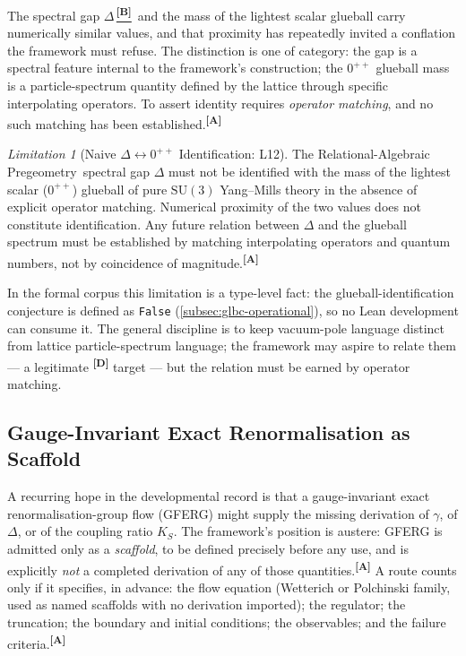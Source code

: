 \documentclass[12pt,a4paper,twoside]{article}
\theoremstyle{plain}
\theoremstyle{definition}
\theoremstyle{remark}
\newtheorem{limitation}[theorem]{Limitation}
\newcommand{\ProjectShort}{Relational-Algebraic Pregeometry}
\newcommand{\RAP}{\ProjectShort}
\newcommand{\catmark}[1]{\textsuperscript{\textsf{\textbf{[#1]}}}}
\newcommand{\Bdelta}{\hyperref[box:pi-override-delta]{\catmark{B}}}
\begin{document}
The spectral gap $\Delta$\,\Bdelta\ and the mass of the lightest scalar
glueball carry numerically similar values, and that proximity has
repeatedly invited a conflation the framework must refuse. The
distinction is one of category: the gap is a spectral feature internal
to the framework's construction; the $0^{++}$ glueball mass is a
particle-spectrum quantity defined by the lattice through specific
interpolating operators. To assert identity requires \emph{operator
matching}, and no such matching has been established.\catmark{A}

\begin{limitation}[Naive $\Delta\!\leftrightarrow\!0^{++}$ Identification: L12]
\label{lim:L12}
The \RAP\ spectral gap $\Delta$ must not be identified with the mass of
the lightest scalar ($0^{++}$) glueball of pure $\mathrm{SU}(3)$
Yang--Mills theory in the absence of explicit operator matching.
Numerical proximity of the two values does not constitute
identification. Any future relation between $\Delta$ and the glueball
spectrum must be established by matching interpolating operators and
quantum numbers, not by coincidence of magnitude.\catmark{A}
\end{limitation}

\noindent In the formal corpus this limitation is a type-level fact: the
glueball-identification conjecture is defined as \texttt{False}
(\cref{subsec:glbc-operational}), so no Lean development can consume it.
The general discipline is to keep vacuum-pole language distinct from
lattice particle-spectrum language; the framework may aspire to relate
them --- a legitimate \catmark{D} target --- but the relation must be
earned by operator matching.

\subsection{Gauge-Invariant Exact Renormalisation as Scaffold}
\label{subsec:gferg-scaffold}

A recurring hope in the developmental record is that a gauge-invariant
exact renormalisation-group flow (GFERG) might supply the missing
derivation of $\gamma$, of $\Delta$, or of the coupling ratio $K_S$. The
framework's position is austere: GFERG is admitted only as a
\emph{scaffold}, to be defined precisely before any use, and is
explicitly \emph{not} a completed derivation of any of those
quantities.\catmark{A} A route counts only if it specifies, in advance:
the flow equation (Wetterich or Polchinski family, used as named
scaffolds with no derivation imported); the regulator; the truncation;
the boundary and initial conditions; the observables; and the failure
criteria.\catmark{A}
\end{document}
